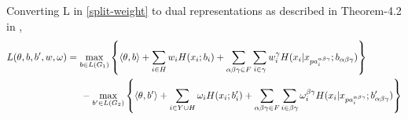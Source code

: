 \documentclass{article}
\begin{document}
Converting L in \ref{split-weight} to dual representations as described in Theorem-4.2 in \cite{Ping2015},
\begin{align}
L(\theta,b,b',w,\omega)&= \max_{b\in L(G_1)}  \left\{ \langle \theta,b \rangle+\sum_{i\in H}w_iH(x_i;b_i)+\sum_{\alpha\beta\gamma\in F}\sum_{i\in \gamma}w_i^{\gamma}H(x_i|x_{pa_i^{\alpha\beta\gamma}};b_{\alpha\beta\gamma}) \right \} \nonumber \\\label{dual}&\hspace{5mm}- \max_{b'\in L(G_2)}  \left\{ \langle \theta,b' \rangle+\sum_{i\in Y\cup H}\omega_iH(x_i;b'_i)+\sum_{\alpha\beta\gamma\in F}\sum_{i\in \beta\gamma}\omega_i^{\beta\gamma}H(x_i|x_{pa_i^{\alpha\beta\gamma}};b'_{\alpha\beta\gamma})  \right\}
\end{align}
\end{document}
